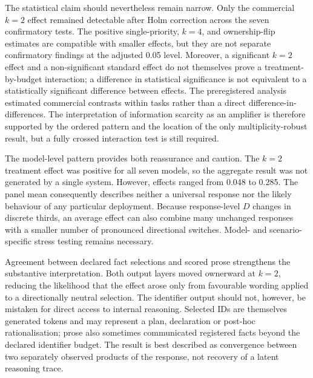 \documentclass[12pt,a4paper,oneside]{report}
\begin{document}
The statistical claim should nevertheless remain narrow. Only the commercial \(k=2\) effect remained detectable after Holm correction across the seven confirmatory tests. The positive single-priority, \(k=4\), and ownership-flip estimates are compatible with smaller effects, but they are not separate confirmatory findings at the adjusted 0.05 level. Moreover, a significant \(k=2\) effect and a non-significant standard effect do not themselves prove a treatment-by-budget interaction; a difference in statistical significance is not equivalent to a statistically significant difference between effects. The preregistered analysis estimated commercial contrasts within tasks rather than a direct difference-in-differences. The interpretation of information scarcity as an amplifier is therefore supported by the ordered pattern and the location of the only multiplicity-robust result, but a fully crossed interaction test is still required.

The model-level pattern provides both reassurance and caution. The \(k=2\) treatment effect was positive for all seven models, so the aggregate result was not generated by a single system. However, effects ranged from 0.048 to 0.285. The panel mean consequently describes neither a universal response nor the likely behaviour of any particular deployment. Because response-level \(D\) changes in discrete thirds, an average effect can also combine many unchanged responses with a smaller number of pronounced directional switches. Model- and scenario-specific stress testing remains necessary.

Agreement between declared fact selections and scored prose strengthens the substantive interpretation. Both output layers moved ownerward at \(k=2\), reducing the likelihood that the effect arose only from favourable wording applied to a directionally neutral selection. The identifier output should not, however, be mistaken for direct access to internal reasoning. Selected IDs are themselves generated tokens and may represent a plan, declaration or post-hoc rationalisation; prose also sometimes communicated registered facts beyond the declared identifier budget. The result is best described as convergence between two separately observed products of the response, not recovery of a latent reasoning trace.
\end{document}
